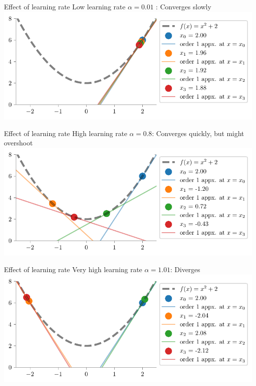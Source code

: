 \documentclass[usenames,dvipsnames]{beamer}
\begin{document}
  \begin{frame}{Effect of learning rate}
    Low learning rate $\alpha=0.01$ : Converges slowly
    \includegraphics[scale=0.8]{../figures/mml/gd-lr-0.01.pdf}
  \end{frame}

  \begin{frame}{Effect of learning rate}
    High learning rate $\alpha=0.8$: Converges quickly, but might overshoot
    \includegraphics[scale=0.8]{../figures/mml/gd-lr-0.8.pdf}
  \end{frame}

    \begin{frame}{Effect of learning rate}
        Very high learning rate $\alpha=1.01$: Diverges
        \includegraphics[scale=0.8]{../figures/mml/gd-lr-1.01.pdf}
    \end{frame}
\end{document}
